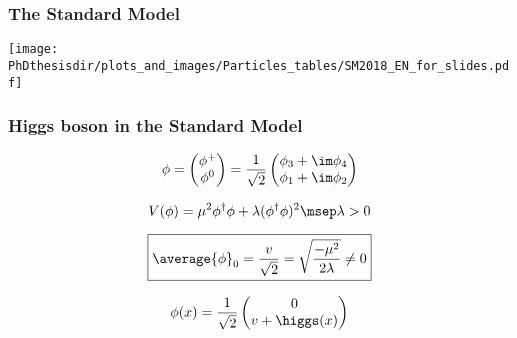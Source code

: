 \begin{frame}
\frametitle{The Standard Model}
\begin{center}
\vspace{-5pt}
\texttt{[image: \\PhDthesisdir/plots\_and\_images/Particles\_tables/SM2018\_EN\_for\_slides.pdf]}
\vspace{-5pt}
\end{center}
\end{frame}

\begin{frame}
\frametitle{Higgs boson in the Standard Model}

\begin{minipage}[c]{.45\textwidth}
\begin{equation*}
\phi
=
\begin{pmatrix}
\phi^+ \\ \phi^0
\end{pmatrix}
=
\frac{1}{\sqrt{2}}
\begin{pmatrix}
\phi_3 + \im \phi_4 \\ \phi_1 + \im \phi_2
\end{pmatrix}
\end{equation*}

\begin{equation*}
V(\phi)
= \mu^2\phi^\dagger\phi + \lambda (\phi^\dagger\phi)^2
\msep \lambda > 0
\end{equation*}

\begin{equation*}
\boxed{\average{\phi}_0 = \frac{v}{\sqrt{2}} = \sqrt{\frac{-\mu^2}{2\lambda}} \neq 0}
\end{equation*}

\begin{equation*}
\phi(x)
=
\frac{1}{\sqrt{2}}
\begin{pmatrix}
0 \\ v + \higgs(x)
\end{pmatrix}
\end{equation*}

\end{minipage}
\begin{minipage}[c]{.5\textwidth}
\vspace{-20pt}

\vspace{-20pt}
\end{minipage}

\end{frame}